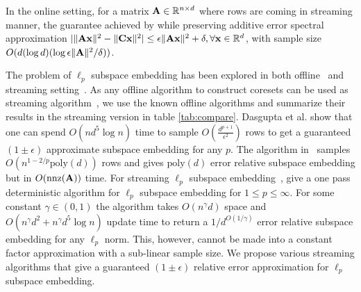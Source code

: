 In the online setting, for a matrix $\mathbf{A} \in \mathbb{R}^{n \times d}$ where rows are coming in streaming manner, the guarantee achieved by \cite{cohen2016online} while preserving additive error spectral approximation $|\|\mathbf{A}\mathbf{x}\|^{2} - \|\mathbf{C}\mathbf{x}\|^{2}| \leq \epsilon \|\mathbf{A}\mathbf{x}\|^{2} + \delta, \forall \mathbf{x} \in \mathbb{R}^{d}$, with sample size $O(d(\log d)(\log \epsilon\|\mathbf{A}\|^{2}/\delta))$.

The problem of $\ell_{p}$ subspace embedding has been explored in both offline~\cite{dasgupta2009sampling, woodruff2013subspace, cohen2015p, clarkson2016fast} and streaming setting~\cite{dickens2018leveraging}. As any offline algorithm to construct coresets can be used as streaming algorithm~\cite{har2004coresets}, we use the known offline algorithms and summarize their results in the streaming version in table \ref{tab:compare}.
Dasgupta et al. \cite{dasgupta2009sampling} show that one can spend $O(nd^{5}\log n)$ time to sample $O(\frac{d^{p+1}}{\epsilon^{2}})$ rows to get a guaranteed $(1\pm \epsilon)$ approximate subspace embedding for any $p$. 
The algorithm in~\cite{woodruff2013subspace} samples $O(n^{1-2/p}\mbox{poly}(d))$ rows and gives $\mbox{poly}(d)$ error relative subspace embedding but in $O(\mbox{nnz}(\mathbf{A}))$ time. For streaming $\ell_{p}$ subspace embedding~\cite{dickens2018leveraging}, give a one pass deterministic algorithm for $\ell_{p}$ subspace embedding for $1\leq p\leq \infty$. 
For some constant $\gamma \in (0,1)$ the algorithm takes $O(n^{\gamma}d)$ space and $O(n^{\gamma}d^{2}+n^{\gamma}d^{5}\log n)$ update time to return a $1/d^{O(1/\gamma)}$ error relative subspace embedding for any $\ell_{p}$ norm. 
This, however, cannot be made into a constant factor approximation with a sub-linear sample size. We propose various streaming algorithms that give a guaranteed $(1\pm\epsilon)$ relative error approximation for $\ell_{p}$ subspace embedding. 